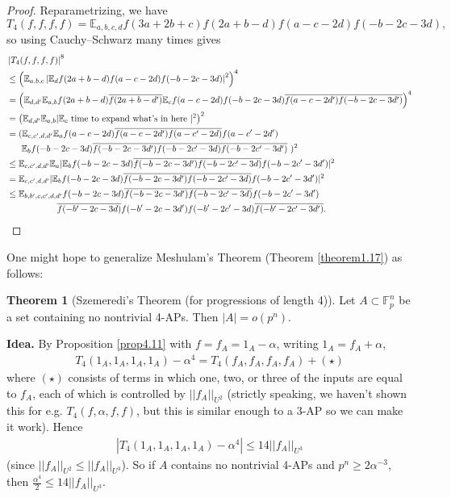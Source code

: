 \documentclass{article}
\theoremstyle{definition}
\newtheorem{theorem}{Theorem}[section]
\begin{document}
\begin{proof}
    Reparametrizing, we have $$T_4(f,f,f,f) = \mathbb{E}_{a,b,c,d}f(3a+2b+c)f(2a+b-d)f(a-c-2d)f(-b-2c-3d),$$
    so using Cauchy--Schwarz many times gives
    \begin{align*}
        &\left|T_4(f,f,f,f)\right|^8\\
        &\le \left(\mathbb{E}_{a,b,c} \left|\mathbb{E}_d f(2a+b-d)f(a-c-2d)f(-b-2c-3d)\right|^2 \right)^4 \\
        &= \left(\mathbb{E}_{d,d'} \mathbb{E}_{a,b} f(2a+b-d)\overline{f(2a+b-d')}\mathbb{E}_c f(a-c-2d)f(-b-2c-3d)\overline{f(a-c-2d')f(-b-2c-3d')}\right)^4 \\
        &= \left(\mathbb{E}_{d,d'}\mathbb{E}_{a,b}|\mathbb{E}_c \text{ time to expand what's in here }|^2\right)^2 \\
        &= (\mathbb{E}_{c,c',d,d'} \mathbb{E}_a f(a-c-2d)\overline{f(a-c-2d')}\overline{f(a-c'-2d)}f(a-c'-2d')\\
        &~ ~~~~\mathbb{E}_b f(-b-2c-3d)\overline{f(-b-2c-3d')}\overline{f(-b-2c'-3d)f(-b-2c'-3d')} ~)^2 \\
        &\le \mathbb{E}_{c,c',d,d'} \mathbb{E}_a | \mathbb{E}_b f(-b-2c-3d)\overline{f(-b-2c-3d')f(-b-2c'-3d)}f(-b-2c'-3d')|^2\\
        &= \mathbb{E}_{c,c',d,d'} | \mathbb{E}_b f(-b-2c-3d)\overline{f(-b-2c-3d')f(-b-2c'-3d)}f(-b-2c'-3d')|^2\\
        &\le \mathbb{E}_{b,b',c,c',d,d'} f(-b-2c-3d)\overline{f(-b-2c-3d')f(-b-2c'-3d)}f(-b-2c'-3d')\\
        &\hspace{20mm}\overline{f(-b'-2c-3d)}f(-b'-2c-3d')f(-b'-2c'-3d)\overline{f(-b'-2c'-3d')}.
    \end{align*}
\end{proof}
One might hope to generalize Meshulam's Theorem (Theorem \ref{theorem1.17}) as follows:
\begin{theorem}[Szemeredi's Theorem (for progressions of length 4)]\label{theorem4.12} 
    Let $A \subset \mathbb{F}_p^n$ be a set containing no nontrivial 4-APs. Then $\left|A\right| = o(p^n).$
\end{theorem}
\textbf{Idea.} By Proposition \ref{prop4.11} with $f = f_A = 1_A -\alpha$, writing $1_A = f_A+\alpha$,
\begin{align*}
    T_4(1_A,1_A,1_A,1_A)-\alpha^4 = T_4(f_A,f_A,f_A,f_A) + (\star)
\end{align*} 
where $(\star)$ consists of terms in which one, two, or three of the inputs are equal to $f_A$, each of which is controlled by $||f_A||_{U^2}$ (strictly speaking, we haven't shown this for e.g. $T_4(f,\alpha,f,f)$, but this is similar enough to a 3-AP so we can make it work). Hence 
\begin{align*}
    \left|T_4(1_A,1_A,1_A,1_A)-\alpha^4\right| \le 14||f_A||_{U^3}
\end{align*}
(since $||f_A||_{U^2}\le ||f_A||_{U^3}$). So if $A$ contains no nontrivial 4-APs and $p^n \ge 2\alpha^{-3}$, then $\frac{\alpha^4}{2}\le 14||f_A||_{U^3}$.
\vspace{1mm}
 
\end{document}
